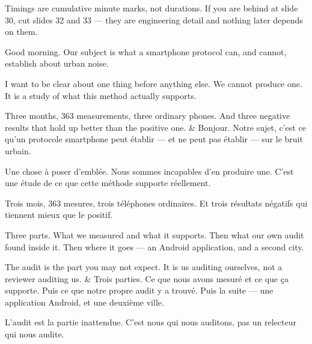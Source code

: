 \documentclass[10pt,a4paper]{article}
\begin{document}
\vspace{3mm}
\noindent
{\footnotesize\color{muted}Timings are cumulative minute marks, not durations.
If you are behind at slide 30, cut slides 32 and 33 --- they are engineering
detail and nothing later depends on them.}

\clearpage


\begin{say}
Good morning. Our subject is what a smartphone protocol can, and cannot,
establish about urban noise.

I want to be clear about one thing before anything else.  We cannot produce one. It is a study of what this method
actually supports.

Three months, 363 measurements, three ordinary phones. And three negative results
that hold up better than the positive one.
&
Bonjour. Notre sujet, c'est ce qu'un protocole smartphone peut établir --- et ne
peut pas établir --- sur le bruit urbain.

Une chose à poser d'emblée.  Nous
sommes incapables d'en produire une. C'est une étude de ce que cette méthode
supporte réellement.

Trois mois, 363 mesures, trois téléphones ordinaires. Et trois résultats négatifs
qui tiennent mieux que le positif.
\end{say}

\begin{say}
Three parts. What we measured and what it supports. Then what our own audit found
inside it. Then where it goes --- an Android application, and a second city.

The audit is the part you may not expect. It is us auditing ourselves, not a
reviewer auditing us.
&
Trois parties. Ce que nous avons mesuré et ce que ça supporte. Puis ce que notre
propre audit y a trouvé. Puis la suite --- une application Android, et une
deuxième ville.

L'audit est la partie inattendue. C'est nous qui nous auditons, pas un relecteur
qui nous audite.
\end{say}
\end{document}
